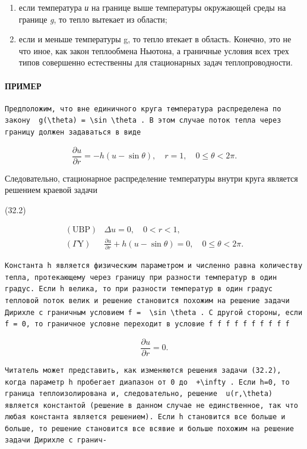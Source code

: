 \documentclass[
  ukrainian,
]{article}
\begin{document}
\begin{enumerate}
\def\labelenumi{\arabic{enumi})}
\item
  если температура \emph{и} на границе выше температуры окружающей среды
  на границе \emph{g}, то тепло вытекает из области;
\item
  если и меньше температуры g, то тепло втекает в область. Конечно, это
  не что иное, как закон теплообмена Ньютона, а граничные условия всех
  трех типов совершенно естественны для стационарных задач
  теплопроводности.
\end{enumerate}

\paragraph{ПРИМЕР}\label{ux43fux440ux438ux43cux435ux440}

\begin{verbatim}
Предположим, что вне единичного круга температура распределена по закону  g(\theta) = \sin \theta . В этом случае поток тепла через границу должен задаваться в виде
\end{verbatim}

\[
\frac{\partial u}{\partial r} = -h(u - \sin \theta), \quad r = 1, \quad 0 \le \theta < 2\pi.
\]

Следовательно, стационарное распределение температуры внутри круга
является решением краевой задачи

(32.2)

\[
\begin{array}{ll} (\text{UBP}) & \Delta u = 0, \quad 0 < r < 1, \\ (\Gamma \text{Y}) & \frac{\partial u}{\partial r} + h \left( u - \sin \theta \right) = 0, \quad 0 \leqslant \theta < 2\pi. \end{array}
\]

\begin{verbatim}
Константа h является физическим параметром и численно равна количеству тепла, протекающему через границу при разности температур в один градус. Если h велика, то при разности температур в один градус тепловой поток велик и решение становится похожим на решение задачи Дирихле с граничным условием f =  \sin \theta . С другой стороны, если f = 0, то граничное условне переходит в условие f f f f f f f f f f
\end{verbatim}

\[
\frac{\partial u}{\partial r} = 0.
\]

\begin{verbatim}
Читатель может представить, как изменяются решения задачи (32.2), когда параметр h пробегает диапазон от 0 до  +\infty . Если h=0, то граница теплоизолирована и, следовательно, решение  u(r,\theta)  является константой (решение в данном случае не единственное, так что любая константа является решением). Если h становится все больше и больше, то решение становится все всявие и больше похожим на решение задачи Дирихле с гранич-
\end{verbatim}
\end{document}
